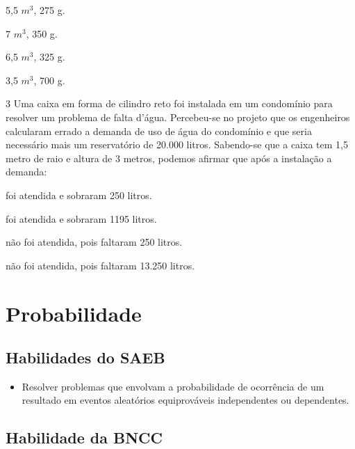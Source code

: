 \begin{escolha}

  \item 5,5 $m^3$, 275 g.

  \item 7 $m^3$, 350 g.

  \item 6,5 $m^3$, 325 g.

  \item 3,5 $m^3$, 700 g.

\end{escolha}


\num{3} Uma caixa em forma de cilindro reto foi instalada em um condomínio
para resolver um problema de falta d'água. Percebeu-se no projeto que os
engenheiros calcularam errado a demanda de uso de água do condomínio e
que seria necessário mais um reservatório de 20.000 litros. Sabendo-se
que a caixa tem 1,5 metro de raio e altura de 3 metros, podemos afirmar
que após a instalação a demanda:

\begin{escolha}
  \item foi atendida e sobraram 250 litros.

  \item foi atendida e sobraram 1195 litros.

  \item não foi atendida, pois faltaram 250 litros.

  \item não foi atendida, pois faltaram 13.250 litros.
\end{escolha}


\chapter{Probabilidade}

\section*{Habilidades do SAEB}

\begin{itemize}

  \item Resolver problemas que envolvam a probabilidade de ocorrência de um
resultado em eventos aleatórios equiprováveis independentes ou
dependentes.   

\end{itemize}

\section*{Habilidade da BNCC}


